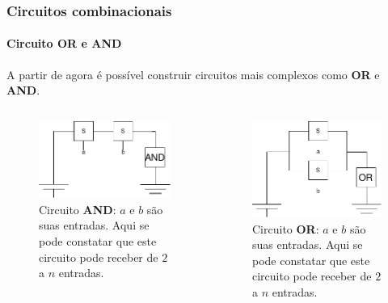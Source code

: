 \begin{frame}
	\frametitle{Circuitos combinacionais}
	\framesubtitle{Circuito OR e AND}
	\par A partir de agora é possível construir circuitos mais complexos como \textbf{OR} e \textbf{AND}.
	\begin{columns}
		\begin{figure}
			\centering
			\includegraphics[width=0.7\linewidth]{images/portaE}
			\caption{Circuito \textbf{AND}: $a$ e $b$ são suas entradas. Aqui se pode constatar que este circuito pode receber de $2$ a $n$ entradas.}
			\label{fig:portae}
		\end{figure}
		\begin{figure}
			\centering
			\includegraphics[width=0.7\linewidth]{images/portaOU}
			\caption{Circuito \textbf{OR}: $a$ e $b$ são suas entradas. Aqui se pode constatar que este circuito pode receber de $2$ a $n$ entradas.}
			\label{fig:portaou}
		\end{figure}
	\end{columns}
\end{frame}

